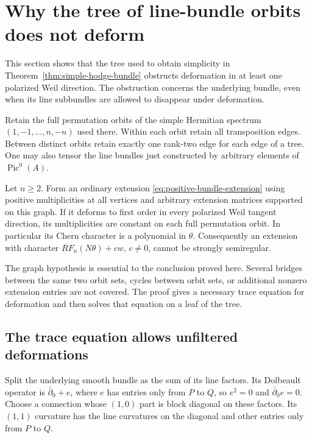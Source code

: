 \section{Why the tree of line-bundle orbits does not deform}
\label{sec:tree-extension-obstruction}

This section shows that the tree used to obtain simplicity in
Theorem~\ref{thm:simple-hodge-bundle} obstructs deformation in at
least one polarized Weil direction.  The obstruction concerns the
underlying bundle, even when its line subbundles are allowed to
disappear under deformation.

Retain the full permutation orbits of the simple Hermitian spectrum
$(1,-1,\ldots,n,-n)$ used there.  Within each orbit retain all
transposition edges.  Between distinct orbits retain exactly one
rank-two edge for each edge of a tree.  One may also tensor the
line bundles just constructed by arbitrary elements of
$\operatorname{Pic}^0(A)$.

\begin{theorem}\label{thm:tree-extension-obstruction}
Let $n\ge2$.  Form an ordinary extension
\eqref{eq:positive-bundle-extension} using positive multiplicities
at all vertices and arbitrary extension matrices supported on this
graph.  If it deforms to first order in every polarized Weil tangent
direction, its multiplicities are constant on each full permutation
orbit.  In particular its Chern character is a polynomial in $\theta$.
Consequently an extension with character
$R F_n(N\theta)+cw$, $c\ne0$, cannot be strongly semiregular.
\end{theorem}

The graph hypothesis is essential to the conclusion proved here.
Several bridges between the same two orbit sets, cycles between
orbit sets, or additional nonzero extension entries are not covered.
The proof gives a necessary trace equation for deformation and then
solves that equation on a leaf of the tree.

\subsection{The trace equation allows unfiltered deformations}

Split the underlying smooth bundle as the sum of its line factors.
Its Dolbeault operator is $\bar\partial_0+e$, where $e$ has entries
only from $P$ to $Q$, so $e^2=0$ and $\bar\partial_0e=0$.
Choose a connection whose $(1,0)$ part is block diagonal on these
factors.  Its $(1,1)$ curvature has the line curvatures on the
diagonal and other entries only from $P$ to $Q$.

